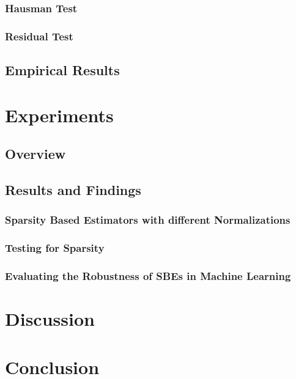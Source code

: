 \subsubsection{Hausman Test}

\subsubsection{Residual Test}


\subsection{Empirical Results}


\section{Experiments}

\subsection{Overview}

\subsection{Results and Findings}

\subsubsection{Sparsity Based Estimators with different Normalizations}

\subsubsection{Testing for Sparsity}

\subsubsection{Evaluating the Robustness of SBEs in Machine Learning}


\section{Discussion}



\section{Conclusion}
\label{conclusion}




